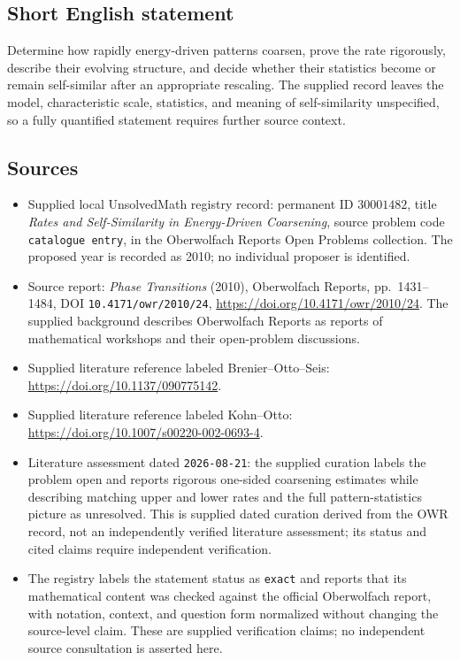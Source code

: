 \documentclass[11pt]{article}
\begin{document}
\subsection{Short English statement}
Determine how rapidly energy-driven patterns coarsen, prove the rate rigorously, describe their evolving structure, and decide whether their statistics become or remain self-similar after an appropriate rescaling. The supplied record leaves the model, characteristic scale, statistics, and meaning of self-similarity unspecified, so a fully quantified statement requires further source context.
\subsection{Sources}
\begin{itemize}
\item Supplied local UnsolvedMath registry record: permanent ID \(30001482\), title \emph{Rates and Self-Similarity in Energy-Driven Coarsening}, source problem code \texttt{catalogue entry}, in the Oberwolfach Reports Open Problems collection. The proposed year is recorded as 2010; no individual proposer is identified.
\item Source report: \emph{Phase Transitions} (2010), Oberwolfach Reports, pp.\ 1431--1484, DOI \texttt{10.4171/owr/2010/24}, \url{https://doi.org/10.4171/owr/2010/24}. The supplied background describes Oberwolfach Reports as reports of mathematical workshops and their open-problem discussions.
\item Supplied literature reference labeled Brenier--Otto--Seis: \url{https://doi.org/10.1137/090775142}.
\item Supplied literature reference labeled Kohn--Otto: \url{https://doi.org/10.1007/s00220-002-0693-4}.
\item Literature assessment dated \texttt{2026-08-21}: the supplied curation labels the problem open and reports rigorous one-sided coarsening estimates while describing matching upper and lower rates and the full pattern-statistics picture as unresolved. This is supplied dated curation derived from the OWR record, not an independently verified literature assessment; its status and cited claims require independent verification.
\item The registry labels the statement status as \texttt{exact} and reports that its mathematical content was checked against the official Oberwolfach report, with notation, context, and question form normalized without changing the source-level claim. These are supplied verification claims; no independent source consultation is asserted here.
\end{itemize}
\end{document}
